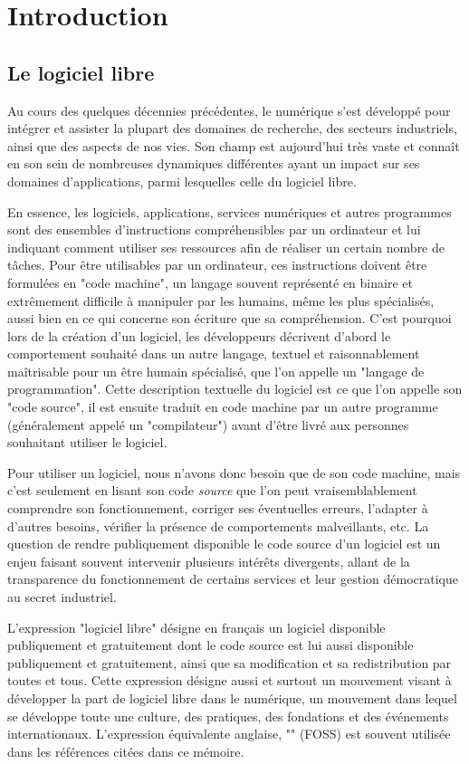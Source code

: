 \chapter{Introduction}

\section{Le logiciel libre}

Au cours des quelques décennies précédentes, le numérique s'est développé pour intégrer et assister la plupart
des domaines de recherche, des secteurs industriels, ainsi que des aspects de nos vies. Son champ est
aujourd'hui très vaste et connaît en son sein de nombreuses dynamiques différentes ayant un impact sur ses
domaines d'applications, parmi lesquelles celle du logiciel libre.

En essence, les logiciels, applications, services numériques et autres programmes sont des ensembles
d'instructions compréhensibles par un ordinateur et lui indiquant comment utiliser ses ressources afin de
réaliser un certain nombre de tâches. Pour être utilisables par un ordinateur, ces instructions doivent être
formulées en "code machine", un langage souvent représenté en binaire et extrêmement difficile à manipuler par
les humains, même les plus spécialisés, aussi bien en ce qui concerne son écriture que sa compréhension. C'est
pourquoi lors de la création d'un logiciel, les développeurs décrivent d'abord le comportement souhaité dans
un autre langage, textuel et raisonnablement maîtrisable pour un être humain spécialisé, que l'on appelle un
"langage de programmation". Cette description textuelle du logiciel est ce que l'on appelle son "code source",
il est ensuite traduit en code machine par un autre programme (généralement appelé un "compilateur") avant
d'être livré aux personnes souhaitant utiliser le logiciel.

Pour utiliser un logiciel, nous n'avons donc besoin que de son code machine, mais c'est seulement en lisant
son code \emph{source} que l'on peut vraisemblablement comprendre son fonctionnement, corriger ses éventuelles
erreurs, l'adapter à d'autres besoins, vérifier la présence de comportements malveillants, etc. La question de
rendre publiquement disponible le code source d'un logiciel est un enjeu faisant souvent intervenir plusieurs
intérêts divergents, allant de la transparence du fonctionnement de certains services et leur gestion
démocratique au secret industriel.

L'expression "logiciel libre" désigne en français un logiciel disponible publiquement et gratuitement dont le
code source est lui aussi disponible publiquement et gratuitement, ainsi que sa modification et sa
redistribution par toutes et tous. Cette expression désigne aussi et surtout un mouvement visant à développer
la part de logiciel libre dans le numérique, un mouvement dans lequel se développe toute une culture, des
pratiques, des fondations et des événements internationaux. L'expression équivalente anglaise, "" (FOSS) est souvent utilisée dans les références citées dans ce mémoire.


